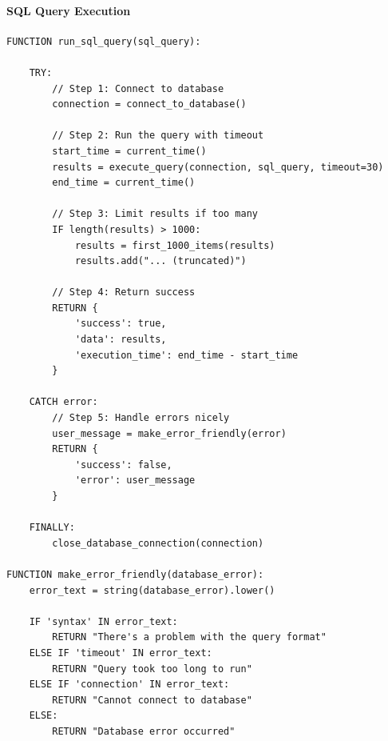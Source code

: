 \paragraph{SQL Query Execution}
\begin{verbatim}
FUNCTION run_sql_query(sql_query):
    
    TRY:
        // Step 1: Connect to database
        connection = connect_to_database()
        
        // Step 2: Run the query with timeout
        start_time = current_time()
        results = execute_query(connection, sql_query, timeout=30)
        end_time = current_time()
        
        // Step 3: Limit results if too many
        IF length(results) > 1000:
            results = first_1000_items(results)
            results.add("... (truncated)")
        
        // Step 4: Return success
        RETURN {
            'success': true,
            'data': results,
            'execution_time': end_time - start_time
        }
    
    CATCH error:
        // Step 5: Handle errors nicely
        user_message = make_error_friendly(error)
        RETURN {
            'success': false,
            'error': user_message
        }
    
    FINALLY:
        close_database_connection(connection)

FUNCTION make_error_friendly(database_error):
    error_text = string(database_error).lower()
    
    IF 'syntax' IN error_text:
        RETURN "There's a problem with the query format"
    ELSE IF 'timeout' IN error_text:
        RETURN "Query took too long to run"
    ELSE IF 'connection' IN error_text:
        RETURN "Cannot connect to database"
    ELSE:
        RETURN "Database error occurred"
\end{verbatim}

